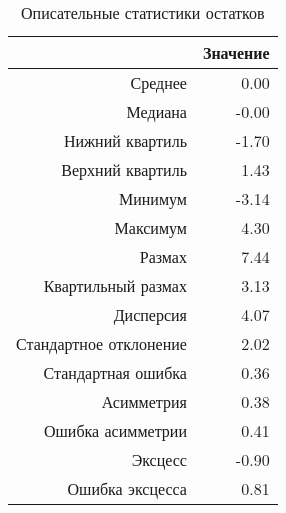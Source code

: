 \begin{table}[ht]
\centering
\begin{tabular}{rr}
  \hline
 & Значение \\ 
  \hline
Среднее & 0.00 \\ 
  Медиана & -0.00 \\ 
  Нижний квартиль & -1.70 \\ 
  Верхний квартиль & 1.43 \\ 
  Минимум & -3.14 \\ 
  Максимум & 4.30 \\ 
  Размах & 7.44 \\ 
  Квартильный размах & 3.13 \\ 
  Дисперсия & 4.07 \\ 
  Стандартное отклонение & 2.02 \\ 
  Стандартная ошибка & 0.36 \\ 
  Асимметрия & 0.38 \\ 
  Ошибка асимметрии & 0.41 \\ 
  Эксцесс & -0.90 \\ 
  Ошибка эксцесса & 0.81 \\ 
   \hline
\end{tabular}
\caption{Описательные статистики остатков} 
\label{table:residuals_dstats}
\end{table}
